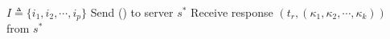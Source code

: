 \begin{algorithm*}[!ht]
\begin{algorithmic}[2]
\vspace{-1.5em}
 \\\hrulefill
\vspace{-1.5em}
      \begin{multicols}{3}{\footnotesize    
          \State $I\triangleq \{i_1, i_2, \cdots, i_p \}$
            \Part{ \underline{\getTagArray}} {
          \State  Send  (\getTagArrayTag) to server $s^*$
          \State  Receive response  $(t_r, ({\kappa}_1, {\kappa}_2, \cdots, {\kappa}_k))$ from  $s^*$
        }\EndPart 
            \Statex
          \EndPart
        }\end{multicols}

    

\end{algorithmic}
\end{algorithm*}
